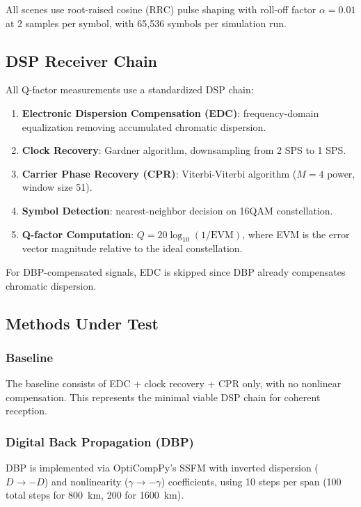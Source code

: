 \documentclass[conference]{IEEEtran}
\begin{document}
All scenes use root-raised cosine (RRC) pulse shaping with roll-off factor $\alpha = 0.01$ at 2 samples per symbol, with 65,536 symbols per simulation run.

\subsection{DSP Receiver Chain}

All Q-factor measurements use a standardized DSP chain:
\begin{enumerate}
    \item \textbf{Electronic Dispersion Compensation (EDC)}: frequency-domain equalization removing accumulated chromatic dispersion.
    \item \textbf{Clock Recovery}: Gardner algorithm, downsampling from 2 SPS to 1 SPS.
    \item \textbf{Carrier Phase Recovery (CPR)}: Viterbi-Viterbi algorithm ($M=4$ power, window size 51).
    \item \textbf{Symbol Detection}: nearest-neighbor decision on 16QAM constellation.
    \item \textbf{Q-factor Computation}: $Q = 20 \log_{10}(1/\text{EVM})$, where EVM is the error vector magnitude relative to the ideal constellation.
\end{enumerate}

For DBP-compensated signals, EDC is skipped since DBP already compensates chromatic dispersion.

\subsection{Methods Under Test}

\subsubsection{Baseline}
The baseline consists of EDC + clock recovery + CPR only, with no nonlinear compensation. This represents the minimal viable DSP chain for coherent reception.

\subsubsection{Digital Back Propagation (DBP)}
DBP is implemented via OptiCompPy's SSFM with inverted dispersion ($D \to -D$) and nonlinearity ($\gamma \to -\gamma$) coefficients, using 10 steps per span (100 total steps for 800~km, 200 for 1600~km).
\end{document}
